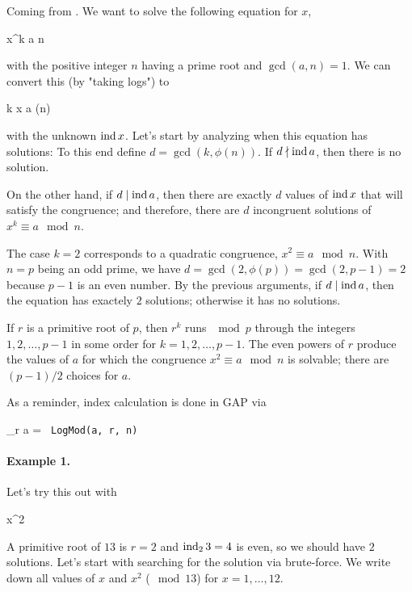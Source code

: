 
Coming from \cite{Burton2011}. We want to solve the following equation for $x$,

\bee
x^k \equiv a \mod n
\eee

with the positive integer $n$ having a prime root and $\gcd(a,n) =1$. We can convert this (by "taking logs") to

\bee
k \ind x \equiv \ind a \mod \phi(n)
\eee

with the unknown $\operatorname{ind} x$. Let's start by analyzing when this equation has solutions: To this end define $d = \gcd(k, \phi(n))$. If $d \nmid \operatorname{ind} a$, then there is no solution.


On the other hand, if $d \mid \operatorname{ind} a$, then there are exactly $d$ values of $\operatorname{ind} x$ that will satisfy the congruence; and therefore, there are $d$ incongruent solutions of $x^k \equiv a \mod n$.

The case $k = 2$ corresponds to a quadratic congruence, $x^2 \equiv a \mod n$. With $n=p$ being an odd prime, we have $d = \gcd(2, \phi(p)) = \gcd(2, p-1) = 2$ because $p-1$ is an even number. By the previous arguments, if $d \mid \operatorname{ind} a$, then the equation has exactely $2$ solutions; otherwise it has no solutions.

If $r$ is a primitive root of $p$, then $r^k$ runs $\mod p$ through the integers $1,2,\ldots,p-1$ in some order for $k=1,2,\ldots,p-1$. The even powers of $r$ produce the values of $a$ for which the congruence $x^2 \equiv a \mod n$ is solvable; there are $(p-1)/2$ choices for $a$.

As a reminder, index calculation is done in GAP via

\bee
  \ind_r a = \verb+ LogMod(a, r, n) +
\eee


\paragraph{Example 1.} Let's try this out with

\bee
x^2  
\eee

A primitive root of $13$ is $r = 2$ and $\operatorname{ind}_2 3 = 4$ is even, so we should have $2$ solutions. Let's start with searching for the solution via brute-force. We write down all values of $x$ and $x^2$ ($\mod 13$) for $x=1,\ldots,12$.

\vspace{2mm}

